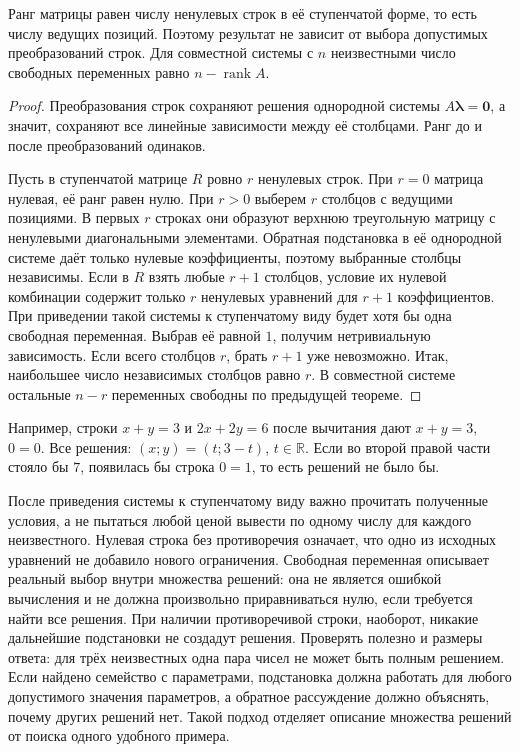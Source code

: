 \ifdim\dimexpr\ht\CatFlowBox+\dp\CatFlowBox\relax<64mm\dp\CatFlowBox=\dimexpr64mm-\ht\CatFlowBox\relax\fi%
\noindent\usebox{\CatFlowBox}\par\addvspace{5pt}

\begin{theorem}\label{thm:legacy-c18-4}
Ранг матрицы равен числу ненулевых строк в её ступенчатой форме, то есть числу ведущих позиций. Поэтому результат не зависит от выбора допустимых преобразований строк. Для совместной системы с \(n\) неизвестными число свободных переменных равно \(n-\operatorname{rank}A\).
\end{theorem}
\begin{proof}
Преобразования строк сохраняют решения однородной системы \(A\symbf\lambda=\symbf0\), а значит, сохраняют все линейные зависимости между её столбцами. Ранг до и после преобразований одинаков.

Пусть в ступенчатой матрице \(R\) ровно \(r\) ненулевых строк. При \(r=0\) матрица нулевая, её ранг равен нулю. При \(r>0\) выберем \(r\) столбцов с ведущими позициями. В первых \(r\) строках они образуют верхнюю треугольную матрицу с ненулевыми диагональными элементами. Обратная подстановка в её однородной системе даёт только нулевые коэффициенты, поэтому выбранные столбцы независимы. Если в \(R\) взять любые \(r+1\) столбцов, условие их нулевой комбинации содержит только \(r\) ненулевых уравнений для \(r+1\) коэффициентов. При приведении такой системы к ступенчатому виду будет хотя бы одна свободная переменная. Выбрав её равной \(1\), получим нетривиальную зависимость. Если всего столбцов \(r\), брать \(r+1\) уже невозможно. Итак, наибольшее число независимых столбцов равно \(r\). В совместной системе остальные \(n-r\) переменных свободны по предыдущей теореме.
\end{proof}
Например, строки \(x+y=3\) и \(2x+2y=6\) после вычитания дают \(x+y=3\), \(0=0\). Все решения: \((x;y)=(t;3-t)\), \(t\in\mathbb R\). Если во второй правой части стояло бы \(7\), появилась бы строка \(0=1\), то есть решений не было бы.

После приведения системы к ступенчатому виду важно прочитать полученные условия, а не пытаться любой ценой вывести по одному числу для каждого неизвестного. Нулевая строка без противоречия означает, что одно из исходных уравнений не добавило нового ограничения. Свободная переменная описывает реальный выбор внутри множества решений: она не является ошибкой вычисления и не должна произвольно приравниваться нулю, если требуется найти все решения. При наличии противоречивой строки, наоборот, никакие дальнейшие подстановки не создадут решения. Проверять полезно и размеры ответа: для трёх неизвестных одна пара чисел не может быть полным решением. Если найдено семейство с параметрами, подстановка должна работать для любого допустимого значения параметров, а обратное рассуждение должно объяснять, почему других решений нет. Такой подход отделяет описание множества решений от поиска одного удобного примера.


